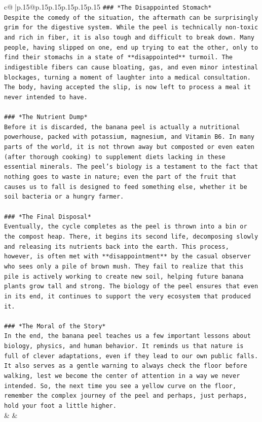\documentclass{article}
\begin{document}
{\begin{supertabular}{c@{$\;$}|p{.15\linewidth}@{}p{.15\linewidth}p{.15\linewidth}p{.15\linewidth}p{.15\linewidth}p{.15\linewidth}}
{{{\texttt{\#\#\# *The Disappointed Stomach*} \\
\texttt{Despite the comedy of the situation, the aftermath can be surprisingly grim for the digestive system. While the peel is technically non{-}toxic and rich in fiber, it is also tough and difficult to break down. Many people, having slipped on one, end up trying to eat the other, only to find their stomachs in a state of **disappointed** turmoil. The indigestible fibers can cause bloating, gas, and even minor intestinal blockages, turning a moment of laughter into a medical consultation. The body, having accepted the slip, is now left to process a meal it never intended to have.} \\
\\ 
\texttt{\#\#\# *The Nutrient Dump*} \\
\texttt{Before it is discarded, the banana peel is actually a nutritional powerhouse, packed with potassium, magnesium, and Vitamin B6. In many parts of the world, it is not thrown away but composted or even eaten (after thorough cooking) to supplement diets lacking in these essential minerals. The peel's biology is a testament to the fact that nothing goes to waste in nature; even the part of the fruit that causes us to fall is designed to feed something else, whether it be soil bacteria or a hungry farmer.} \\
\\ 
\texttt{\#\#\# *The Final Disposal*} \\
\texttt{Eventually, the cycle completes as the peel is thrown into a bin or the compost heap. There, it begins its second life, decomposing slowly and releasing its nutrients back into the earth. This process, however, is often met with **disappointment** by the casual observer who sees only a pile of brown mush. They fail to realize that this pile is actively working to create new soil, helping future banana plants grow tall and strong. The biology of the peel ensures that even in its end, it continues to support the very ecosystem that produced it.} \\
\\ 
\texttt{\#\#\# *The Moral of the Story*} \\
\texttt{In the end, the banana peel teaches us a few important lessons about biology, physics, and human behavior. It reminds us that nature is full of clever adaptations, even if they lead to our own public falls. It also serves as a gentle warning to always check the floor before walking, lest we become the center of attention in a way we never intended. So, the next time you see a yellow curve on the floor, remember the complex journey of the peel and perhaps, just perhaps, hold your foot a little higher.} \\
            }
        }
    }
    & & \\ \\


\end{supertabular}}
\end{document}

